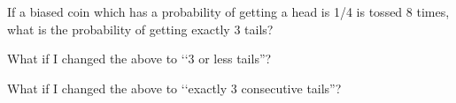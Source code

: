   \begin{tightlist}
    \item
    If a biased coin which has a probability of getting a head is 1/4
    is tossed 8 times, what is the probability of getting exactly 3 tails?
    \item
    What if I changed the above to \lq\lq 3 or less tails''?
    \item
    What if I changed the above to
    \lq\lq exactly 3 consecutive tails''?
  \end{tightlist}
